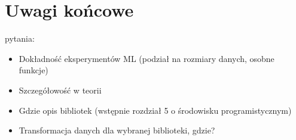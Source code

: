 \chapter{Uwagi końcowe}

pytania:
\begin{itemize}
    \item Dokładność eksperymentów ML (podział na rozmiary danych, osobne funkcje)
    \item Szczegółowość w teorii
    \item Gdzie opis bibliotek (wstępnie rozdział 5 o środowisku programistycznym)
    \item Transformacja danych dla wybranej biblioteki, gdzie?
\end{itemize}